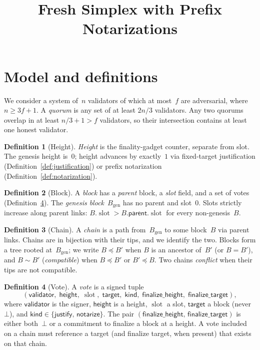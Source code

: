 \ifx\litemode\undefined\documentclass{article}\fi
\title{Fresh Simplex with Prefix Notarizations}
\newcommand{\genesis}{\ensuremath{B_{\mathrm{gen}}}}
\newcommand{\slot}[0]{\ensuremath{\operatorname{\mathrm{slot}}}}
\newcommand{\target}{\mathsf{target}}
\newcommand{\kind}{\mathsf{kind}}
\newcommand{\height}{\mathsf{height}}
\newcommand{\validator}{\mathsf{validator}}
\newcommand{\just}{\ensuremath{\mathsf{justify}}\xspace}
\newcommand{\notar}{\ensuremath{\mathsf{notarize}}\xspace}
\newcommand{\parent}{\mathsf{parent}}
\newcommand{\finalizeHeight}{\mathsf{finalize\_height}}
\newcommand{\finalizeTarget}{\mathsf{finalize\_target}}
\theoremstyle{plain}
\theoremstyle{definition}
\newtheorem{definition}{Definition}
\theoremstyle{remark}
\begin{document}
\maketitle

\section{Model and definitions}

We consider a system of~$n$ validators of which at most~$f$ are adversarial, where $n \geq 3f + 1$.
A \emph{quorum} is any set of at least $2n/3$ validators.
Any two quorums overlap in at least $n/3 + 1 > f$ validators, so their intersection contains at least one honest validator.

\begin{definition}[Height]\label{def:height}
\emph{Height} is the finality-gadget counter, separate from slot.
The genesis height is~$0$; height advances by exactly~$1$ via fixed-target justification (Definition~\ref{def:justification}) or prefix notarization (Definition~\ref{def:notarization}).
\end{definition}

\begin{definition}[Block]\label{def:block}
A \emph{block} has a \emph{parent} block, a \emph{slot} field, and a set of votes (Definition~\ref{def:vote}).
The \emph{genesis block}~$\genesis$ has no parent and slot~$0$.
Slots strictly increase along parent links: $B.\slot > B.\parent.\slot$ for every non-genesis~$B$.
\end{definition}

\begin{definition}[Chain]\label{def:chain}
A \emph{chain} is a path from~$\genesis$ to some block~$B$ via parent links.
Chains are in bijection with their tips, and we identify the two.
Blocks form a tree rooted at~$\genesis$; we write $B \preceq B'$ when $B$ is an ancestor of~$B'$ (or $B = B'$), and $B \sim B'$ (\emph{compatible}) when $B \preceq B'$ or $B' \preceq B$.
Two chains \emph{conflict} when their tips are not compatible.
\end{definition}

\begin{definition}[Vote]\label{def:vote}
A \emph{vote} is a signed tuple
\[
  (\validator,\; \height,\; \slot,\; \target,\; \kind,\; \finalizeHeight,\; \finalizeTarget),
\]
where $\validator$ is the signer, $\height$ is a height, $\slot$ a slot, $\target$ a block (never~$\bot$), and $\kind \in \{\just,\, \notar\}$.
The pair $(\finalizeHeight,\, \finalizeTarget)$ is either both~$\bot$ or a commitment to finalize a block at a height.
A vote included on a chain must reference a target (and finalize target, when present) that exists on that chain.
\end{definition}
\end{document}
